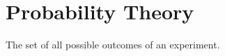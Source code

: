\chapter{Probability Theory}
\begin{definition}
  The set of all possible outcomes of an experiment.
\end{definition}

